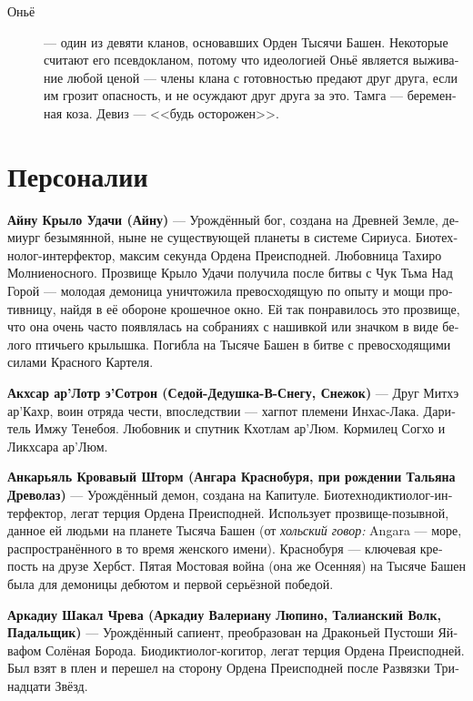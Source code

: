 \documentclass[a4paper,12pt,fleqn]{book}\usepackage{cooltooltips}\usepackage{polyglossia}\setdefaultlanguage[babelshorthands=true]{russian}\setotherlanguage{english}\defaultfontfeatures{Ligatures=TeX,Mapping=tex-text} \usepackage{xcolor}\definecolor{lightgray}{HTML}{bbbbbb}\color{lightgray}\newcommand{\ml}[3]{\textenglish{\textcolor{black}{#3}}}
\newcommand{\theterm}[3]{\textbf{\hypertarget{#1}{#2}} --- #3}
\newcommand{\theorigin}[3]{\textit{#1:} #2 --- #3}
\begin{document}
{\begin{description}
\item[Оньё] --- один из девяти кланов, основавших Орден Тысячи Башен.
Некоторые считают его псевдокланом, потому что идеологией Оньё является выживание любой ценой --- члены клана с готовностью предают друг друга, если им грозит опасность, и не осуждают друг друга за это.
Тамга --- беременная коза.
Девиз --- <<будь осторожен>>.

\end{description}

\chapter{Персоналии}

\theterm{ainu}
{Айну Крыло Удачи (Айну)} %
{Урождённый бог, создана на Древней Земле, демиург безымянной, ныне не существующей планеты в системе Сириуса.
Биотехнолог-интерфектор, максим секунда Ордена Преисподней.
Любовница Тахиро Молниеносного.
Прозвище Крыло Удачи получила после битвы с Чук Тьма Над Горой --- молодая демоница уничтожила превосходящую по опыту и мощи противницу, найдя в её обороне крошечное окно.
Ей так понравилось это прозвище, что она очень часто появлялась на собраниях с нашивкой или значком в виде белого птичьего крылышка.
Погибла на Тысяче Башен в битве с превосходящими силами Красного Картеля.}

\theterm{akchsar-ar-lotr}
{Акхсар ар’Лотр э’Сотрон (Седой-Дедушка-В-Снегу, Снежок)}
{Друг Митхэ ар'Кахр, воин отряда чести, впоследствии --- хагпот племени Инхас-Лака.
Даритель Имжу Тенебоя.
Любовник и спутник Кхотлам ар'Люм.
Кормилец Согхо и Ликхсара ар'Люм.}

\theterm{ancarjal} %
{Анкарьяль Кровавый Шторм (Ангара Краснобуря, при рождении Тальяна Древолаз)}
{Урождённый демон, создана на Капитуле.
Биотехнодиктиолог-интерфектор, легат терция Ордена Преисподней.
Использует прозвище-позывной, данное ей людьми на планете Тысяча Башен (от \theorigin{хольский говор}{Angara}{море}, распространённого в то время женского имени).
Краснобуря --- ключевая крепость на друзе Хербст.
Пятая Мостовая война (она же Осенняя) на Тысяче Башен была для демоницы дебютом и первой серьёзной победой.}

\theterm{arcadiju} %
{Аркадиу Шакал Чрева (Аркадиу Валериану Люпино, Талианский Волк, Падальщик)}
{Урождённый сапиент, преобразован на Драконьей Пустоши Яйвафом Солёная Борода.
Биодиктиолог-когитор, легат терция Ордена Преисподней.
Был взят в плен и перешел на сторону Ордена Преисподней после Развязки Тринадцати Звёзд.}

}
\end{document}
